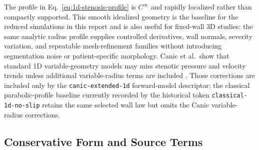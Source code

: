 \begin{remark}
    \label{rmk:1d-stenosis-profile-scope}
    The profile in Eq.~\ref{eq:1d-stenosis-profile} is $C^\infty$ and
    rapidly localized rather than compactly supported. This smooth idealized
    geometry is the baseline for the reduced simulations in this report and is
    also useful for fixed-wall 3D studies: the same analytic radius profile
    supplies controlled derivatives, wall normals, severity variation, and
    repeatable mesh-refinement families without introducing segmentation noise
    or patient-specific morphology. Canic et al.\ show that standard 1D
    variable-geometry models may miss stenotic pressure and velocity trends
    unless additional variable-radius terms are included
    \cite[Abstract; Secs.~1--2]{CanicEtAl2024Extended1DStenosis}. Those
    corrections are included only by the \texttt{canic-extended-1d}
    forward-model descriptor; the classical parabolic-profile baseline
    currently recorded by the historical token \texttt{classical-1d-no-slip}
    retains the same selected wall law but omits the Canic variable-radius
    corrections.
\end{remark}

\subsection{Conservative Form and Source Terms}
\label{subsec:conservative-form-source-terms}

